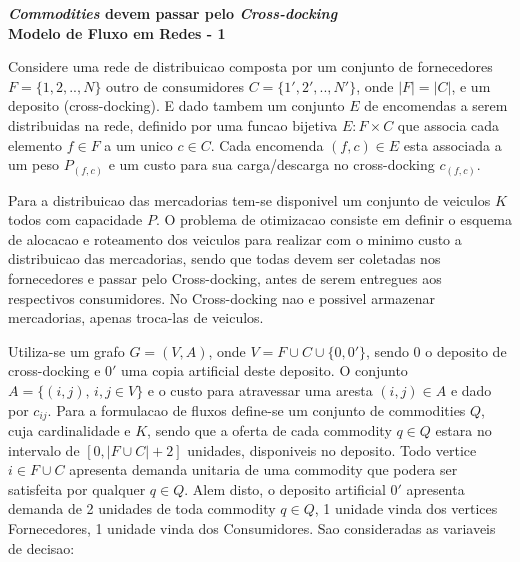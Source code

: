 \documentclass[12pt]{article}
\begin{document}
\begin{center}
\textbf{\textit{Commodities} devem passar pelo \emph{Cross-docking}} \\
\textbf{Modelo de Fluxo em Redes - 1} \\
\end{center}
\vspace{0.4cm}
\noindent Considere uma rede de distribuicao composta por um conjunto de fornecedores $F=\{1,2,..,N\}$ outro de consumidores $C=\{1',2',..,N'\}$, onde $|F|=|C|$, e um deposito (cross-docking). E dado tambem um conjunto $E$ de encomendas a serem distribuidas na rede, definido por uma funcao bijetiva $E:F \times C$ que associa cada elemento $f \in F$ a um unico $c \in C$. Cada encomenda $(f,c) \in E$ esta associada a um peso $P_{(f,c)}$ e um custo para sua carga/descarga no cross-docking $c_{(f,c)}$.

\vspace{0.2cm}
Para a distribuicao das mercadorias tem-se disponivel um conjunto de veiculos $K$ todos com capacidade $P$. O problema de otimizacao consiste em definir o esquema de alocacao e roteamento dos veiculos para realizar com o minimo custo a distribuicao das mercadorias, sendo que todas devem ser coletadas nos fornecedores e passar pelo Cross-docking, antes de serem entregues aos respectivos consumidores. No Cross-docking nao e possivel armazenar mercadorias, apenas troca-las de veiculos.

\vspace{0.2cm}
Utiliza-se um grafo $G=(V,A)$, onde $V = F \cup C \cup \{0,0'\}$, sendo $0$ o deposito de cross-docking e $0'$ uma copia artificial deste deposito. O conjunto $A=\{(i,j), \, i,j \in V\}$ e o custo para atravessar uma aresta $(i,j) \in A$ e dado por $c_{ij}$. Para a formulacao de fluxos define-se um conjunto de commodities $Q$, cuja cardinalidade e $K$, sendo que a oferta de cada commodity $q \in Q$ estara no intervalo de $[0,|F \cup C|+2]$ unidades, disponiveis no deposito. Todo vertice $i \in F \cup C$ apresenta demanda unitaria de uma commodity que podera ser satisfeita por qualquer $q \in Q$. Alem disto, o deposito artificial $0'$ apresenta demanda de 2 unidades de toda commodity $q \in Q$, 1 unidade vinda dos vertices Fornecedores, 1 unidade vinda dos Consumidores. Sao consideradas as variaveis de decisao:
\end{document}
